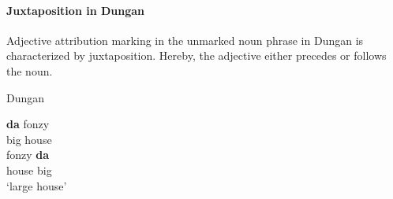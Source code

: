 \paragraph*{Juxtaposition in Dungan}
Adjective attribution marking in the unmarked noun phrase in Dungan is characterized by juxtaposition. Hereby, the adjective either precedes or follows the noun.
\begin{exe}
\ex \rm{Dungan \citep[480]{kalimov1968}} \label{dungan juxtap}
\begin{xlist}
\ex 	
\gll	\textbf{da} fonzy\\
	big house\\
\ex
\gll	fonzy \textbf{da}\\
	house big\\
\glt	‘large house’
\end{xlist}
\end{exe}

